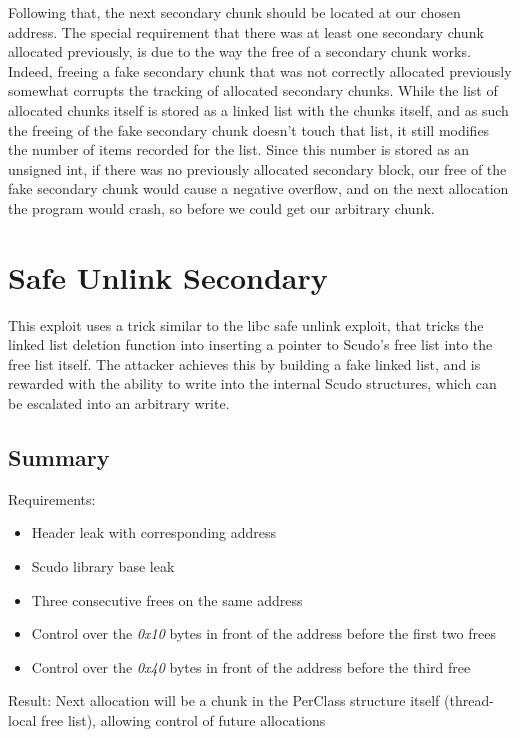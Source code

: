 \documentclass[a4paper,11pt,oneside]{report}
\begin{document}
Following that, the next secondary chunk should be located at our chosen address. The
special requirement that there was at least one secondary chunk allocated previously, is
due to the way the free of a secondary chunk works. Indeed, freeing a fake secondary chunk
that was not correctly allocated previously somewhat corrupts the tracking of allocated
secondary chunks. While the list of allocated chunks itself is stored as a linked list
with the chunks itself, and as such the freeing of the fake secondary chunk doesn't touch
that list, it still modifies the number of items recorded for the list. Since this number
is stored as an unsigned int, if there was no previously allocated secondary block, our
free of the fake secondary chunk would cause a negative overflow, and on the next
allocation the program would crash, so before we could get our arbitrary chunk.


\section{Safe Unlink Secondary}

This exploit uses a trick similar to the libc safe unlink exploit, that tricks the linked
list deletion function into inserting a pointer to Scudo's free list into the free list
itself. The attacker achieves this by building a fake linked list, and is rewarded with
the ability to write into the internal Scudo structures, which can be escalated into an
arbitrary write.

\subsection{Summary}

Requirements:
\begin{itemize}
\item Header leak with corresponding address
\item Scudo library base leak
\item Three consecutive frees on the same address
\item Control over the \emph{0x10} bytes in front of the address before the first two
  frees
\item Control over the \emph{0x40} bytes in front of the address before the third free
\end{itemize}

Result: Next allocation will be a chunk in the PerClass structure itself (thread-local
free list), allowing control of future allocations
\end{document}
